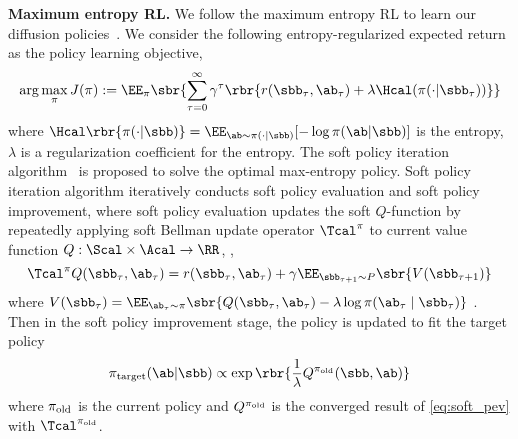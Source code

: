 \textbf{Maximum entropy RL.} We follow the maximum entropy RL to learn our diffusion policies~\cite{haarnoja2017reinforcement}. We consider the following entropy-regularized expected return as the policy learning objective,
\begin{equation}
    \arg\max_\pi J(\pi) := \EE_{\pi}\sbr{\sum_{\tau=0}^\infty\gamma^\tau \rbr{r(\sbb_\tau, \ab_\tau) + \lambda\Hcal(\pi(\cdot | \sbb_\tau))}}\label{eq:obj_max_ent_rl}
\end{equation}
where $\Hcal\rbr{\pi(\cdot| \sbb)} = \EE_{\ab\sim\pi(\cdot | \sbb)}[-\log\pi(\ab | \sbb)]$ is the entropy, $\lambda$ is a regularization coefficient for the entropy. 
The soft policy iteration algorithm~\cite{haarnoja2017reinforcement,haarnoja2018soft} is proposed to solve the optimal max-entropy policy. Soft policy iteration algorithm iteratively conducts soft policy evaluation and soft policy improvement, where soft policy evaluation updates the soft $Q$-function by repeatedly applying soft Bellman update operator $\Tcal^\pi$ to current value function $Q:\Scal\times\Acal\to \RR$, \ie, 
\begin{equation}
    \Tcal^\pi Q(\sbb_\tau, \ab_\tau) = r(\sbb_\tau, \ab_\tau) + \gamma\EE_{\sbb_{\tau+1}\sim P}\sbr{V(\sbb_{\tau+1})}\label{eq:soft_pev}
\end{equation}
where $V(\sbb_\tau) = \EE_{\ab_\tau\sim\pi}\sbr{Q(\sbb_\tau, \ab_\tau) - \lambda \log\pi(\ab_\tau\mid \sbb_\tau)}$ \cite{haarnoja2018soft}. Then in the soft policy improvement stage, the policy is updated to fit the target policy
\begin{equation}
    \pi_{\rm target}(\ab| \sbb) 
    \propto \exp\rbr{\frac{1}{\lambda}{Q^{\pi_{\rm old}}(\sbb, \ab)}} \label{eq:energy_based_opt_pi}
\end{equation}
where ${\pi_{\rm old}}$ is the current policy and $Q^{\pi_{\rm old}}$ is the converged result of \eqref{eq:soft_pev} with $\Tcal^{\pi_{\rm old}}$.

